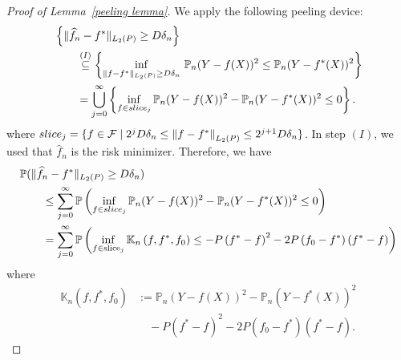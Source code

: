 \documentclass[12pt]{article}
\begin{document}
\begin{appendices}
\begin{proof}[Proof of Lemma~\ref{peeling lemma}]
We apply the following peeling device:
\begin{equation}\nonumber
    \begin{aligned}
    & \left\{\|\widehat f_n - f^*\|_{L_2(P)} \geq D\delta_n\right\}\nonumber\\
    &\qquad \stackrel{(I)}{\subseteq}\left\{ \inf_{\|f - f^*\|_{L_2(P)} \geq D\delta_n} \,\mathbb{P}_n(Y- f(X))^2 \leq \mathbb{P}_n(Y- f^*(X))^2\right\}\\
    & \qquad = \bigcup_{j=0}^{\infty} \left\{\inf_{f\in {\rm slice}_j} \mathbb{P}_n(Y- f(X))^2 - \mathbb{P}_n(Y- f^*(X))^2 \leq 0\right\}.
    \end{aligned}
\end{equation}
where ${\rm slice}_j = \{f\in\mathcal{F} \mid 2^j D \delta_n \leq\left\|f-f^*\right\|_{L_2(P)} \leq 2^{j+1} D \delta_n\}$. In step $(I)$, we used that $\widehat f_n$ is the risk minimizer. Therefore, we have
\begin{equation}\label{eq:afterpeeling}
\begin{aligned}
    & \mathbb{P}(\|\widehat f_n - f^*\|_{L_2(P)}\geq D\delta_n) 
    \\
    &\qquad\leq \sum_{j=0}^{\infty} \mathbb{P}\left(\inf_{f\in {\rm slice}_j} \mathbb{P}_n(Y- f(X))^2 - \mathbb{P}_n(Y- f^*(X))^2 \leq 0\right)\\
    &\qquad = \sum_{j=0}^{\infty} \mathbb{P}\left(\inf _{f \in \operatorname{slice}_j} \mathbb{K}_n\left(f, f^*, f_0\right) \leq-P\left(f^*-f\right)^2-2 P\left(f_0-f^*\right)\left(f^*-f\right)\right)
\end{aligned}
\end{equation}
where
\begin{equation*}
  \begin{aligned}
    \mathbb{K}_n(f,f^*,f_0) & := \mathbb{P}_n(Y- f(X))^2 - 
    \mathbb{P}_n(Y- f^*(X))^2 \\
    & \quad - P(f^* - f)^2 - 2P(f_0 - f^*)(f^* - f).
\end{aligned}  
\end{equation*}


\end{proof}
\end{appendices}
\end{document}
